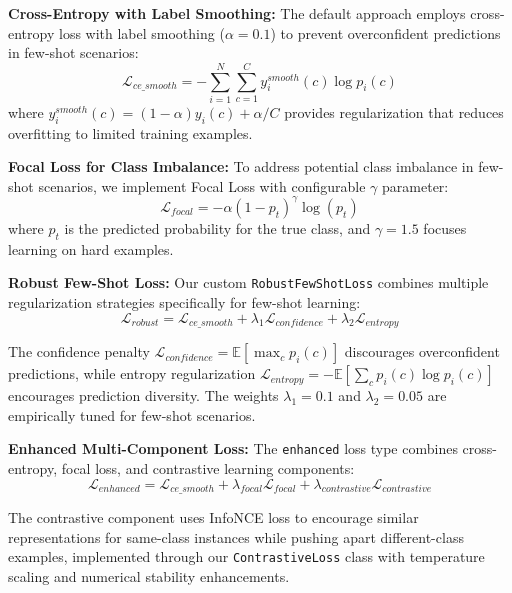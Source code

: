 \textbf{Cross-Entropy with Label Smoothing:} The default approach employs cross-entropy loss with label smoothing ($\alpha = 0.1$) to prevent overconfident predictions in few-shot scenarios:
\begin{equation}
\mathcal{L}_{ce\_smooth} = -\sum_{i=1}^{N} \sum_{c=1}^{C} y_i^{smooth}(c) \log p_i(c)
\end{equation}
where $y_i^{smooth}(c) = (1-\alpha)y_i(c) + \alpha/C$ provides regularization that reduces overfitting to limited training examples.

\textbf{Focal Loss for Class Imbalance:} To address potential class imbalance in few-shot scenarios, we implement Focal Loss with configurable $\gamma$ parameter:
\begin{equation}
\mathcal{L}_{focal} = -\alpha(1-p_t)^\gamma \log(p_t)
\end{equation}
where $p_t$ is the predicted probability for the true class, and $\gamma = 1.5$ focuses learning on hard examples.

\textbf{Robust Few-Shot Loss:} Our custom \texttt{RobustFewShotLoss} combines multiple regularization strategies specifically for few-shot learning:
\begin{equation}
\mathcal{L}_{robust} = \mathcal{L}_{ce\_smooth} + \lambda_1 \mathcal{L}_{confidence} + \lambda_2 \mathcal{L}_{entropy}
\end{equation}

The confidence penalty $\mathcal{L}_{confidence} = \mathbb{E}[\max_c p_i(c)]$ discourages overconfident predictions, while entropy regularization $\mathcal{L}_{entropy} = -\mathbb{E}[\sum_c p_i(c) \log p_i(c)]$ encourages prediction diversity. The weights $\lambda_1 = 0.1$ and $\lambda_2 = 0.05$ are empirically tuned for few-shot scenarios.

\textbf{Enhanced Multi-Component Loss:} The \texttt{enhanced} loss type combines cross-entropy, focal loss, and contrastive learning components:
\begin{equation}
\mathcal{L}_{enhanced} = \mathcal{L}_{ce\_smooth} + \lambda_{focal} \mathcal{L}_{focal} + \lambda_{contrastive} \mathcal{L}_{contrastive}
\end{equation}

The contrastive component uses InfoNCE loss to encourage similar representations for same-class instances while pushing apart different-class examples, implemented through our \texttt{ContrastiveLoss} class with temperature scaling and numerical stability enhancements.

